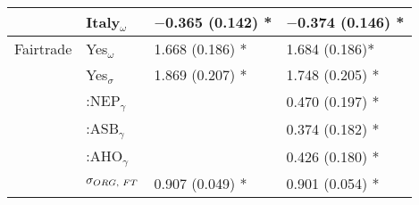 \documentclass[sustainability,article,accept,moreauthors,pdftex,10pt,a4paper]{Definitions/mdpi}
\theoremstyle{mdpi}
\theoremstyle{mdpidefinition}
\begin{document}
{{\begin{table}[H]
\begin{tabular}{p{2cm}p{3.5cm} p{3cm} p{3cm}}
& Italy$_\omega$ &                        $-$0.365 (0.142) *              & $-$0.374 (0.146) *              \\ %
\midrule
Fairtrade & Yes$_\omega$ &                1.668 (0.186) *              & 1.684 (0.186)*               \\ %
& Yes$_\sigma$  &                 1.869 (0.207) *              & 1.748 (0.205) *               \\ %
& :NEP$_\gamma$ &                                             & 0.470 (0.197) *               \\ %
& :ASB$_\gamma$ &                                             & 0.374 (0.182) *              \\ %
& :AHO$_\gamma$ &                                             &  0.426 (0.180) *              \\ %
& $\sigma_{ORG,\hspace{1mm} FT}$ & 0.907 (0.049) *   & 0.901 (0.054) *         \\ %

\end{tabular}
\end{table}}}
\end{document}
